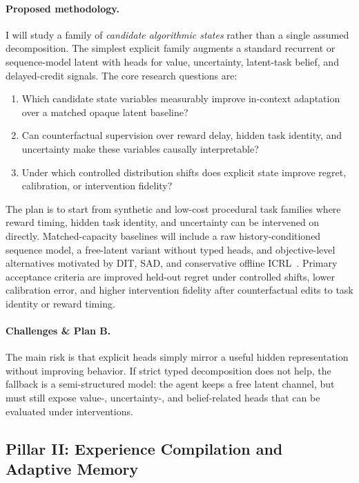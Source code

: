\documentclass[10pt,twocolumn,letterpaper]{article}
\begin{document}
\paragraph{Proposed methodology.}
I will study a family of \emph{candidate algorithmic states} rather than a single assumed decomposition. The simplest explicit family augments a standard recurrent or sequence-model latent with heads for value, uncertainty, latent-task belief, and delayed-credit signals. The core research questions are:
\begin{enumerate}[leftmargin=1.3em]
\item Which candidate state variables measurably improve in-context adaptation over a matched opaque latent baseline?
\item Can counterfactual supervision over reward delay, hidden task identity, and uncertainty make these variables causally interpretable?
\item Under which controlled distribution shifts does explicit state improve regret, calibration, or intervention fidelity?
\end{enumerate}
The plan is to start from synthetic and low-cost procedural task families where reward timing, hidden task identity, and uncertainty can be intervened on directly. Matched-capacity baselines will include a raw history-conditioned sequence model, a free-latent variant without typed heads, and objective-level alternatives motivated by DIT, SAD, and conservative offline ICRL~\cite{dong2024dit,dong2024sad,tarasov2025qlearning}. Primary acceptance criteria are improved held-out regret under controlled shifts, lower calibration error, and higher intervention fidelity after counterfactual edits to task identity or reward timing.

\paragraph{Challenges \& Plan B.}
The main risk is that explicit heads simply mirror a useful hidden representation without improving behavior. If strict typed decomposition does not help, the fallback is a semi-structured model: the agent keeps a free latent channel, but must still expose value-, uncertainty-, and belief-related heads that can be evaluated under interventions.

\subsection{Pillar II: Experience Compilation and Adaptive Memory}
\end{document}

